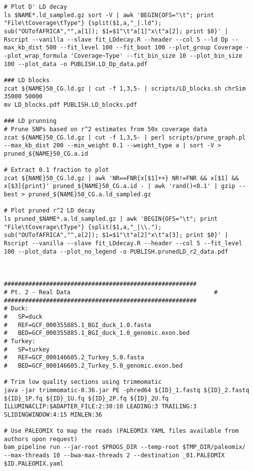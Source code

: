 \documentclass[a4paper]{article}
\begin{document}
\begin{lstlisting}
# Plot D' LD decay
ls $NAME*.ld_sampled.gz sort -V | awk 'BEGIN{OFS="\t"; print "File\tCoverage\tType"} {split($1,a,"_|.ld"); sub("OUTofAFRICA","",a[1]); $1=$1"\t"a[1]"x\t"a[2]; print $0}' | Rscript --vanilla --slave fit_LDdecay.R --header --col 5 --ld Dp --max_kb_dist 500 --fit_level 100 --fit_boot 100 --plot_group Coverage --plot_wrap_formula 'Coverage~Type' --fit_bin_size 10 --plot_bin_size 100 --plot_data -o PUBLISH.LD_Dp_data.pdf

### LD blocks
zcat ${NAME}50_CG.ld.gz | cut -f 1,3,5- | scripts/LD_blocks.sh chrSim 35000 50000
mv LD_blocks.pdf PUBLISH.LD_blocks.pdf

### LD prunning
# Prune SNPs based on r^2 estimates from 50x coverage data
zcat ${NAME}50_CG.ld.gz | cut -f 1,3,5- | perl scripts/prune_graph.pl --max_kb_dist 200 --min_weight 0.1 --weight_type a | sort -V > pruned_${NAME}50_CG.a.id

# Extract 0.1 fraction to plot
zcat ${NAME}50_CG.ld.gz | awk 'NR==FNR{x[$1]++} NR!=FNR && x[$1] && x[$3]{print}' pruned_${NAME}50_CG.a.id - | awk 'rand()<0.1' | gzip --best > pruned_${NAME}50_CG.a.ld_sampled.gz

# Plot pruned r^2 LD decay
ls pruned_$NAME*.a.ld_sampled.gz | awk 'BEGIN{OFS="\t"; print "File\tCoverage\tType"} {split($1,a,"_|\\."); sub("OUTofAFRICA","",a[2]); $1=$1"\t"a[2]"x\t"a[3]; print $0}' | Rscript --vanilla --slave fit_LDdecay.R --header --col 5 --fit_level 100 --plot_data --plot_no_legend -o PUBLISH.prunedLD_r2_data.pdf



#######################################################
# Pt. 2 - Real Data                                         #
#######################################################
# Duck:
#	SP=duck
#	REF=GCF_000355885.1_BGI_duck_1.0.fasta
#	BED=GCF_000355885.1_BGI_duck_1.0_genomic.exon.bed
# Turkey:
#	SP=turkey
#	REF=GCF_000146605.2_Turkey_5.0.fasta
#	BED=GCF_000146605.2_Turkey_5.0_genomic.exon.bed

# Trim low quality sections using trimmomatic
java -jar trimmomatic-0.36.jar PE -phred64 ${ID}_1.fastq ${ID}_2.fastq
${ID}_1P.fq ${ID}_1U.fq ${ID}_2P.fq ${ID}_2U.fq 
ILLUMINACLIP:$ADAPTER_FILE:2:30:10 LEADING:3 TRAILING:3 SLIDINGWINDOW:4:15 MINLEN:36

# Use PALEOMIX to map the reads (PALEOMIX YAML files available from authors upon request)
bam_pipeline run --jar-root $PROGS_DIR --temp-root $TMP_DIR/paleomix/ --max-threads 10 --bwa-max-threads 2 --destination _01.PALEOMIX $ID.PALEOMIX.yaml


\end{lstlisting}
\end{document}
